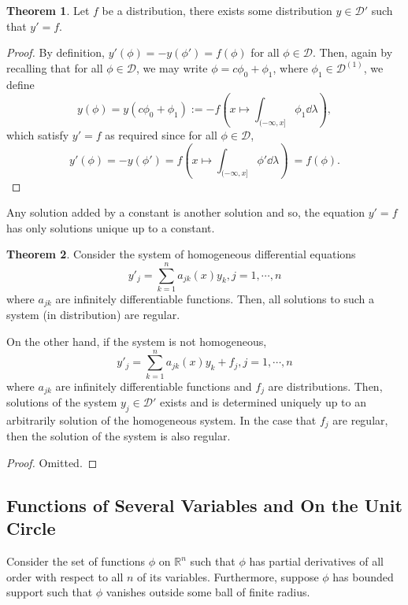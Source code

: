\documentclass[]{article}
\theoremstyle{definition}
\newtheorem{theorem}{Theorem}
\theoremstyle{definition}
\begin{document}
\begin{theorem}
  Let \(f\) be a distribution, there exists some distribution \(y \in \mathcal{D}'\) 
  such that \(y' = f\).
\end{theorem}
\begin{proof}
  By definition, \(y'(\phi) = -y(\phi') = f(\phi)\) for all \(\phi \in \mathcal{D}\).
  Then, again by recalling that for all \(\phi \in \mathcal{D}\), we may write 
  \(\phi = c\phi_0 + \phi_1\), where \(\phi_1 \in \mathcal{D}^{(1)}\), we 
  define 
  \[y(\phi) = y(c\phi_0 + \phi_1) := -f\left(x \mapsto 
    \int_{(-\infty, x]} \phi_1 \dd \lambda\right),\]
  which satisfy \(y' = f\) as required since for all \(\phi \in \mathcal{D}\),
  \[y'(\phi) = -y(\phi') = f\left(x \mapsto \int_{(-\infty, x]} \phi' \dd \lambda\right)\
    = f(\phi).\]
\end{proof}

Any solution added by a constant is another solution and so, the equation \(y' = f\) 
has only solutions unique up to a constant.

\begin{theorem}
  Consider the system of homogeneous differential equations 
  \[y'_j = \sum_{k = 1}^n a_{jk}(x)y_k, j = 1, \cdots, n\]
  where \(a_{jk}\) are infinitely differentiable functions. Then, all solutions 
  to such a system (in distribution) are regular. 

  On the other hand, if the system is not homogeneous,
  \[y'_j = \sum_{k = 1}^n a_{jk}(x)y_k + f_j, j = 1, \cdots, n\]
  where \(a_{jk}\) are infinitely differentiable functions and \(f_j\) are 
  distributions. Then, solutions of the system \(y_j \in \mathcal{D}'\) 
  exists and is determined uniquely up to an arbitrarily solution of the 
  homogeneous system. In the case that \(f_j\) are regular, then the solution 
  of the system is also regular. 
\end{theorem}
\begin{proof}
  Omitted.
\end{proof}

\subsection{Functions of Several Variables and On the Unit Circle}

Consider the set of functions \(\phi\) on \(\mathbb{R}^n\) such that \(\phi\) 
has partial derivatives of all order with respect to all \(n\) of its variables.
Furthermore, suppose \(\phi\) has bounded support such that \(\phi\) vanishes 
outside some ball of finite radius.  
\end{document}
